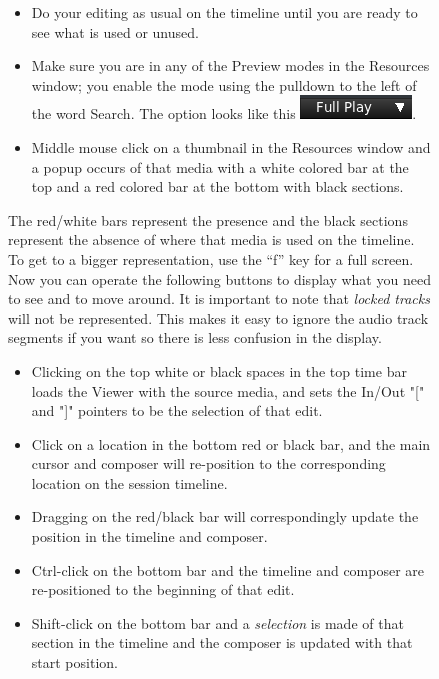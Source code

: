 \begin{figure}
\begin{itemize}
    \item Do your editing as usual on the timeline until you are ready to see what is used or unused.
    \item Make sure you are in any of the Preview modes in the Resources window; you enable the mode using the pulldown to the left of the word Search.  The option looks like this
    \quad \includegraphics[height=\baselineskip]{images/fullplay.png}.   \item Middle mouse click on a thumbnail in the Resources window and a popup occurs of that media with a
    white colored bar at the top and a red colored bar at the bottom with black sections.
\end{itemize}

The red/white bars represent the presence and the black sections represent the absence of where that media is used on the timeline.  To get to a bigger representation, use the “f” key for a full screen.  Now
you can operate the following buttons to display what you need to see and to move around.  It is important to note that \textit{locked tracks} will not be represented.  This makes it easy to ignore the audio track segments if you want so there is less confusion in the display.
\begin{itemize}
    \item Clicking on the top white or black spaces in the top time bar loads the Viewer with the source media,
    and sets the In/Out "[" and "]" pointers to be the selection of that edit.
    \item Click on a location in the bottom red or black bar, and the main cursor and composer will re-position
    to the corresponding location on the session timeline.
    \item Dragging on the red/black bar will correspondingly update the position in the timeline and composer.
    \item Ctrl-click on the bottom bar and the timeline and composer are re-positioned to the beginning of that
    edit.
    \item Shift-click on the bottom bar and a \textit{selection} is made of that section in the timeline and the composer
    is updated with that start position.
\end{itemize}


\end{figure}
